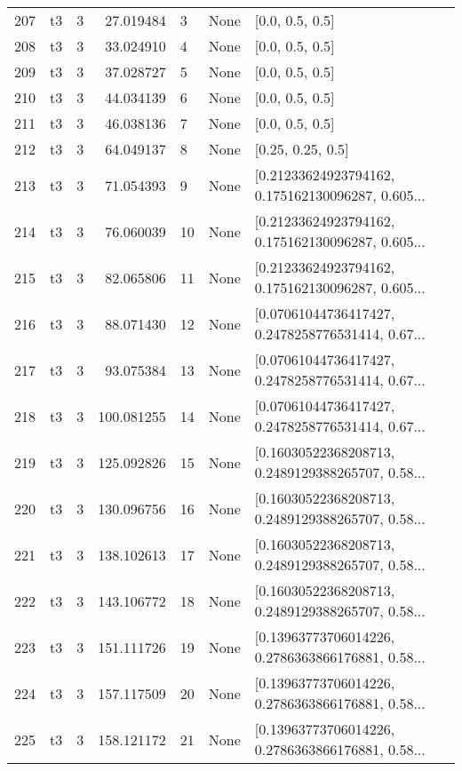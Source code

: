 \begin{tabular}{lllrlll}
207 &  t3 &   3 &   27.019484 &    3 &  None &                                    [0.0, 0.5, 0.5] \\
208 &  t3 &   3 &   33.024910 &    4 &  None &                                    [0.0, 0.5, 0.5] \\
209 &  t3 &   3 &   37.028727 &    5 &  None &                                    [0.0, 0.5, 0.5] \\
210 &  t3 &   3 &   44.034139 &    6 &  None &                                    [0.0, 0.5, 0.5] \\
211 &  t3 &   3 &   46.038136 &    7 &  None &                                    [0.0, 0.5, 0.5] \\
212 &  t3 &   3 &   64.049137 &    8 &  None &                                  [0.25, 0.25, 0.5] \\
213 &  t3 &   3 &   71.054393 &    9 &  None &  [0.21233624923794162, 0.175162130096287, 0.605... \\
214 &  t3 &   3 &   76.060039 &   10 &  None &  [0.21233624923794162, 0.175162130096287, 0.605... \\
215 &  t3 &   3 &   82.065806 &   11 &  None &  [0.21233624923794162, 0.175162130096287, 0.605... \\
216 &  t3 &   3 &   88.071430 &   12 &  None &  [0.07061044736417427, 0.2478258776531414, 0.67... \\
217 &  t3 &   3 &   93.075384 &   13 &  None &  [0.07061044736417427, 0.2478258776531414, 0.67... \\
218 &  t3 &   3 &  100.081255 &   14 &  None &  [0.07061044736417427, 0.2478258776531414, 0.67... \\
219 &  t3 &   3 &  125.092826 &   15 &  None &  [0.16030522368208713, 0.2489129388265707, 0.58... \\
220 &  t3 &   3 &  130.096756 &   16 &  None &  [0.16030522368208713, 0.2489129388265707, 0.58... \\
221 &  t3 &   3 &  138.102613 &   17 &  None &  [0.16030522368208713, 0.2489129388265707, 0.58... \\
222 &  t3 &   3 &  143.106772 &   18 &  None &  [0.16030522368208713, 0.2489129388265707, 0.58... \\
223 &  t3 &   3 &  151.111726 &   19 &  None &  [0.13963773706014226, 0.2786363866176881, 0.58... \\
224 &  t3 &   3 &  157.117509 &   20 &  None &  [0.13963773706014226, 0.2786363866176881, 0.58... \\
225 &  t3 &   3 &  158.121172 &   21 &  None &  [0.13963773706014226, 0.2786363866176881, 0.58... \\

\end{tabular}
